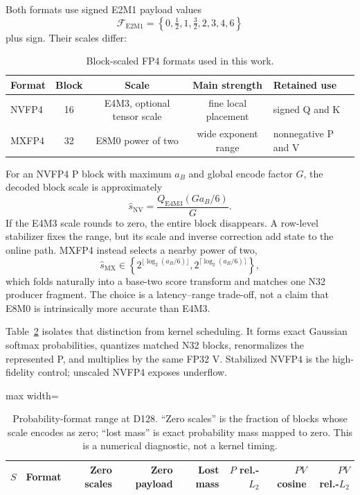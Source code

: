 Both formats use signed E2M1 payload values
\begin{equation}
  \mathcal F_{\mathrm{E2M1}}=
  \left\{0,\tfrac12,1,\tfrac32,2,3,4,6\right\}
\end{equation}
plus sign. Their scales differ:
\begin{table}[htbp]
\centering
\caption{Block-scaled FP4 formats used in this work.}
\label{tab:fp4-formats}
\small
\begin{tabularx}{\textwidth}{lcccX}
\toprule
Format & Block & Scale & Main strength & Retained use \\
\midrule
NVFP4 & 16 & E4M3, optional tensor scale & fine local placement & signed Q and K \\
MXFP4 & 32 & E8M0 power of two & wide exponent range & nonnegative P and V \\
\bottomrule
\end{tabularx}
\end{table}

For an NVFP4 P block with maximum $a_B$ and global encode factor $G$, the
decoded block scale is approximately
\begin{equation}
  \widehat s_{\mathrm{NV}}=
  \frac{Q_{\mathrm{E4M3}}(G a_B/6)}{G}.
  \label{eq:nv-scale}
\end{equation}
If the E4M3 scale rounds to zero, the entire block disappears. A row-level
stabilizer fixes the range, but its scale and inverse correction add state to
the online path. MXFP4 instead selects a nearby power of two,
\begin{equation}
  \widehat s_{\mathrm{MX}}\in
  \left\{2^{\lfloor\log_2(a_B/6)\rfloor},
          2^{\lceil\log_2(a_B/6)\rceil}\right\},
  \label{eq:mx-scale}
\end{equation}
which folds naturally into a base-two score transform and matches one N32
producer fragment. The choice is a latency--range trade-off, not a claim that
E8M0 is intrinsically more accurate than E4M3.

Table~\ref{tab:p-range} isolates that distinction from kernel scheduling. It
forms exact Gaussian softmax probabilities, quantizes matched N32 blocks,
renormalizes the represented P, and multiplies by the same FP32 V. Stabilized
NVFP4 is the high-fidelity control; unscaled NVFP4 exposes underflow.

\begin{table}[htbp]
\centering
\caption{Probability-format range at D128. ``Zero scales'' is the fraction
of blocks whose scale encodes as zero; ``lost mass'' is exact probability
mass mapped to zero. This is a numerical diagnostic, not a kernel timing.}
\label{tab:p-range}
\scriptsize
\begin{adjustbox}{max width=\textwidth}
\begin{tabular}{llrrrrrr}
\toprule
$S$ & Format & Zero scales & Zero payload & Lost mass & $P$ rel.-$L_2$
& $PV$ cosine & $PV$ rel.-$L_2$ \\
\midrule
%
\end{tabular}
\end{adjustbox}
\end{table}


